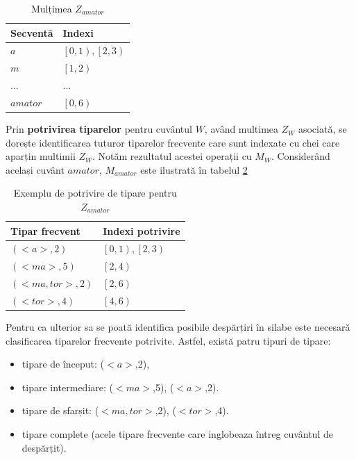 \begin{table}[b!]
\centering    
\begin{tabular}{|l|l|}    
\hline      
Secventă & Indexi\\
\hline
$a$ 		& $\left[0,1\right), \left[2,3\right)$  \\
$m$ 		& $\left[1,2\right)$  \\
... 		& ...  \\
$amator$ 	& $\left[0,6\right)$  \\

\hline
\end{tabular}
\caption{Mulțimea $Z_{amator}$}
\label{table:sdb_substrings}               
\end{table}  

\begin{defi} Prin \textbf{potrivirea tiparelor} pentru cuvântul $W$, având multimea $Z_W$ asociată, se dorește identificarea tuturor tiparelor frecvente care sunt indexate cu chei care aparțin multimii $Z_W$. Notăm rezultatul acestei operații cu $M_W$. Considerând același cuvânt $amator$, $M_{amator}$ este ilustrată în tabelul \ref{table:sdb_pattern_match}
\end{defi}

\begin{table}[h!]
\centering    
\begin{tabular}{|l|l|}    
\hline      
Tipar frecvent & Indexi potrivire\\
\hline
$(<a>, 2)$			& $\left[0,1\right), \left[2,3\right)$   \\
$(<ma>, 5)$  		& $\left[2,4\right)$\\
$(<ma, tor>, 2)$ 	& $\left[2,6\right)$ \\
$(<tor>, 4)$  		& $\left[4,6\right)$\\
\hline
\end{tabular}
\caption{Exemplu de potrivire de tipare pentru $Z_{amator}$}
\label{table:sdb_pattern_match}               
\end{table}  

Pentru ca ulterior sa se poată identifica posibile despărțiri în silabe este necesară clasificarea tiparelor frecvente potrivite. Astfel, există patru tipuri de tipare:  

\begin{itemize}
\item tipare de început: ($<a>$,2),
\item tipare intermediare: ($<ma>$,5), ($<a>$,2).
\item tipare de sfarșit: ($<ma, tor>$,2), ($<tor>$,4).  
\item tipare complete (acele tipare frecvente care inglobeaza întreg cuvântul de despărțit).
\end{itemize}

